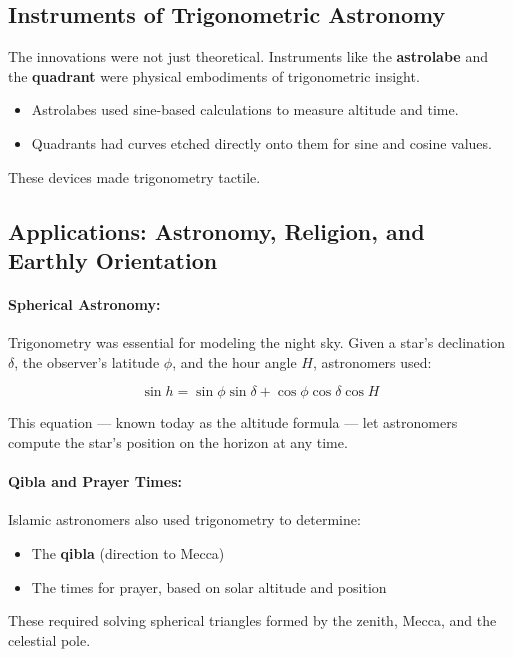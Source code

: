 \subsection{Instruments of Trigonometric Astronomy}

The innovations were not just theoretical. Instruments like the \textbf{astrolabe} and the \textbf{quadrant} were physical embodiments of trigonometric insight.

\begin{itemize}
    \item Astrolabes used sine-based calculations to measure altitude and time.
    \item Quadrants had curves etched directly onto them for sine and cosine values.
\end{itemize}

These devices made trigonometry tactile.

\subsection{Applications: Astronomy, Religion, and Earthly Orientation}

\paragraph{Spherical Astronomy:} Trigonometry was essential for modeling the night sky. Given a star’s declination \( \delta \), the observer’s latitude \( \phi \), and the hour angle \( H \), astronomers used:

\[
\sin h = \sin \phi \sin \delta + \cos \phi \cos \delta \cos H
\]

This equation — known today as the altitude formula — let astronomers compute the star’s position on the horizon at any time.

\paragraph{Qibla and Prayer Times:} Islamic astronomers also used trigonometry to determine:

\begin{itemize}
    \item The \textbf{qibla} (direction to Mecca)
    \item The times for prayer, based on solar altitude and position
\end{itemize}

These required solving spherical triangles formed by the zenith, Mecca, and the celestial pole.

